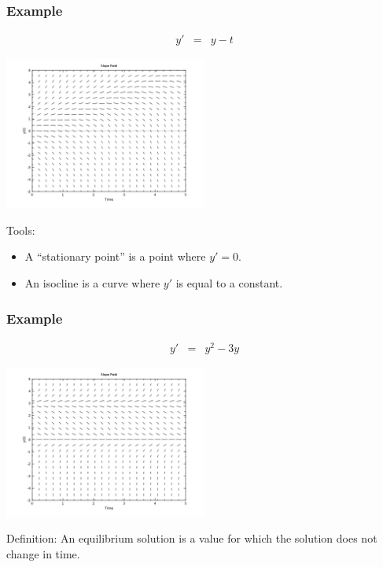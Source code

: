 \begin{frame}
  \frametitle{Example}

  \vspace*{-4em}

  \begin{eqnarray*}
    y' & = & y - t
  \end{eqnarray*}

  \includegraphics[height=5cm]{img/week1Day2SlopeField2}

  Tools:
  \begin{itemize}
  \item A ``{\color{red}stationary point}'' is a point where $y'=0$.
  \item An {\color{red}isocline} is a curve where $y'$ is equal to a constant.
  \end{itemize}

\end{frame}


\begin{frame}
  \frametitle{Example}

  \vspace*{-4em}

  \begin{eqnarray*}
    y' & = & y^2 - 3y
  \end{eqnarray*}

  \includegraphics[height=5cm]{img/week1Day2SlopeField3}

  {\color{red}Definition: An equilibrium solution is a value for which the
  solution does not change in time.}


\end{frame}

